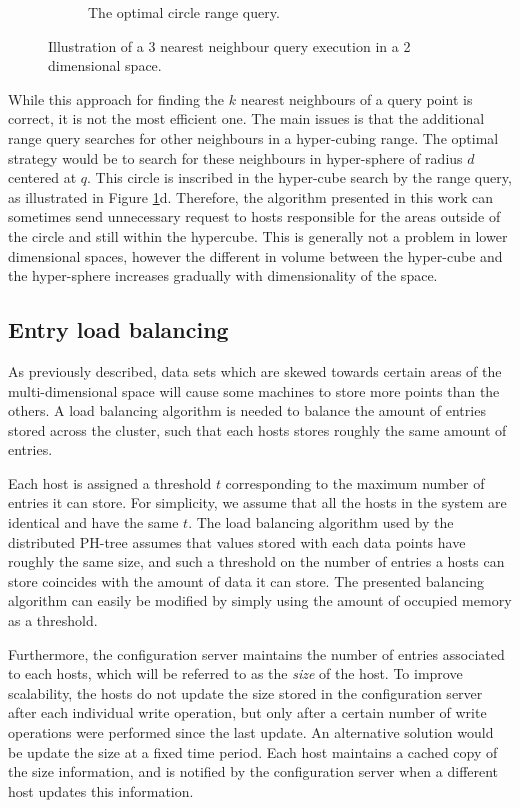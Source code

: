 \documentclass[11pt,a4paper]{globis-book}
\begin{document}
\begin{figure}
\begin{subfigure}[b]{0.4\linewidth}
        \caption{The optimal circle range query.}
    \end{subfigure}
    \caption{Illustration of a 3 nearest neighbour query execution in a 2 dimensional space. }
    \label{fig:knn}
\end{figure}

While this approach for finding the $k$ nearest neighbours of a query point is correct, it is not the most efficient one. The main issues is that the additional range query searches for other neighbours in a hyper-cubing range. The optimal strategy would be to search for these neighbours in hyper-sphere of radius $d$ centered at $q$. This circle is inscribed in the hyper-cube search by the range query, as illustrated in Figure \ref{fig:knn}d. Therefore, the algorithm presented in this work can sometimes send unnecessary request to hosts responsible for the areas outside of the circle and still within the hypercube. This is generally not a problem in lower dimensional spaces, however the different in volume between the hyper-cube and the hyper-sphere increases gradually with dimensionality of the space. 

\subsection{Entry load balancing}

As previously described, data sets which are skewed towards certain areas of the multi-dimensional space will cause some machines to store more points than the others. A load balancing algorithm is needed to balance the amount of entries stored across the cluster, such that each hosts stores roughly the same amount of entries. 

Each host is assigned a threshold $t$ corresponding to the maximum number of entries it can store. For simplicity, we assume that all the hosts in the system are identical and have the same $t$. The load balancing algorithm used by the distributed PH-tree assumes that values stored with each data points have roughly the same size, and such a threshold on the number of entries a hosts can store coincides with the amount of data it can store. The presented balancing algorithm can easily be modified by simply using the amount of occupied memory as a threshold. 

Furthermore, the configuration server maintains the number of entries associated to each hosts, which will be referred to as the \textit{size} of the host. To improve scalability, the hosts do not update the size stored in the configuration server after each individual write operation, but only after a certain number of write operations were performed since the last update. An alternative solution would be update the size at a fixed time period. Each host maintains a cached copy of the size information, and is notified by the configuration server when a different host updates this information.
\end{document}
